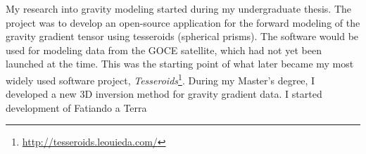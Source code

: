 \documentclass[12pt]{article}
\begin{document}

My research into gravity modeling
started during my undergraduate thesis.
%
The project was to develop an open-source application
for the forward modeling of the gravity gradient tensor
using tesseroids (spherical prisms).
%
The software would be used
for modeling data from the GOCE satellite,
which had not yet been launched at the time.
%
This was the starting point
of what later became
my most widely used software project,
\textit{Tesseroids}\footnote{\url{http://tesseroids.leouieda.com/}}.
%
During my Master's degree,
I developed a new 3D inversion method
for gravity gradient data.
I started development of Fatiando a Terra


\end{document}
